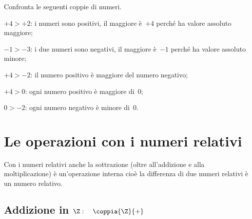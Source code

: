 \begin{esempio}{}{}
Confronta le seguenti coppie di numeri.
\begin{itemize*}
\item \(+4 > +2\): i numeri sono positivi, il maggiore è~\(+4\) perché ha 
valore assoluto maggiore;
\item \(-1 > -3\): i due numeri sono negativi, il maggiore è~\(-1\) perché 
ha valore assoluto minore;
\item \(+4 > -2\): il numero positivo è maggiore del numero negativo;
\item \(+4 > 0\): ogni numero positivo è maggiore di~0;
\item \(0 > -2\): ogni numero negativo è minore di~0.
\end{itemize*}
\end{esempio}


\section{Le operazioni con i numeri relativi}
\label{sec:int_operazioni}

Con i numeri relativi anche la sottrazione (oltre all'addizione e alla 
moltiplicazione) è un'operazione interna cioè la differenza di due numeri 
relativi è un numero relativo.

\subsection{Addizione in $\Z: \quad \coppia{\Z}{+}$}


